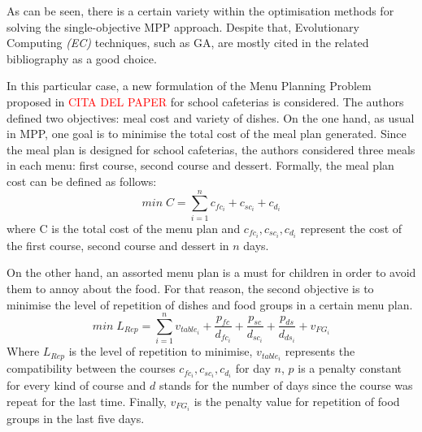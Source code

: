 As can be seen, there is a certain variety within the optimisation methods for solving the single-objective MPP approach. Despite that, Evolutionary Computing \textit{(EC)} techniques, such as GA, are mostly cited in the related bibliography as a good choice\cite{Ngo2016, Seljak2009, Moreira2018}. 

In this particular case, a new formulation of the Menu Planning Problem proposed in \textcolor{red}{CITA DEL PAPER} for school cafeterias is considered. The authors defined two objectives: meal cost and variety of dishes.
On the one hand, as usual in MPP, one goal is to minimise the total cost of the meal plan generated. Since the meal plan is designed for school cafeterias, the authors considered three meals in each menu: first course, second course and dessert. Formally, the meal plan cost can be defined as follows:
\[
    min\; C = \sum_{i=1}^{n}{c_{fc_{i}} + c_{sc_{i}} + c_{d_{i}}}
\]
where C is the total cost of the menu plan and $c_{fc_{i}}, c_{sc_{i}}, c_{d_{i}}$ represent the cost of the first course, second course and dessert in $n$ days.

On the other hand, an assorted menu plan is a must for children in order to avoid them to annoy about the food. For that reason, the second objective is to minimise the level of repetition of dishes and food groups in a certain menu plan. 
\[
    min\; L_{Rep} = \sum_{i=1}^{n}{v_{table_{i}} + \frac{p_{fc}}{d_{fc_{i}}} + \frac{p_{sc}}{d_{sc_{i}}} + \frac{p_{ds}}{d_{ds_{i}}} + v_{FG_{i}}}
\]
Where $L_{Rep}$ is the level of repetition to minimise, $v_{table_{i}}$ represents the compatibility between the courses $c_{fc_{i}}, c_{sc_{i}}, c_{d_{i}}$ for day $n$, $p$ is a penalty constant for every kind of course and $d$ stands for the number of days since the course was repeat for the last time. Finally, $v_{FG_{i}}$ is the penalty value for repetition of food groups in the last five days.

